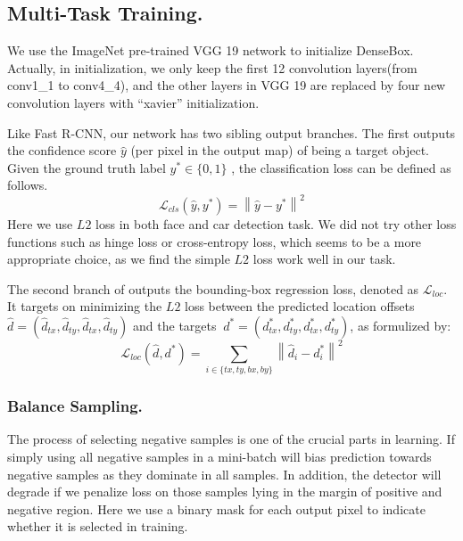 \subsection{Multi-Task Training.} 
\label{sec:training} 
We use the ImageNet pre-trained VGG 19 network to initialize DenseBox. Actually, in initialization, we only keep the first 12 convolution layers(from conv1\_1 to conv4\_4), and the other layers in VGG 19 are replaced by four new convolution layers with “xavier” initialization. 

Like Fast R-CNN, our network has two sibling output branches.  The first outputs the confidence score $ \hat{y}$ (per pixel in the output map) of being a target object.  Given the ground truth label $y^* \in \{0,1 \}$ , the classification loss can be defined as follows. 
	\begin{equation}\label{eq:eq_cls_loss}
	\mathcal{L} _{cls}(\hat{y},y^*) = \left \| \hat{y} - y^* \right \| ^2
	\end{equation}
Here we use $L2$ loss in both face and car detection task. We did not try other loss functions such as hinge loss or cross-entropy loss, which seems to be a more appropriate choice, as we find the simple $L2$ loss work well in our task. 

The second branch of outputs the bounding-box regression loss, denoted as $\mathcal{L} _{loc}$.  It targets on minimizing the $L2$ loss between the predicted location offsets $\hat{d} = (\hat{d}_{tx}, \hat{d}_{ty}, \hat{d}_{tx}, \hat{d}_{ty})$ and the targets  $\ d^* = (d^{*}_{tx},  d^{*}_{ty},  d^{*}_{tx}, d^{*}_{ty})$, as formulized by:
	\begin{equation}\label{eq:eq_loc_loss}
	\mathcal{L} _{loc}(\hat{d},d^*) =  \sum_{i \in \{ tx, ty,bx,by \} }  \left \| \hat{d}_{i} - d^*_{i} \right \| ^2
	\end{equation}

 \subsubsection{Balance Sampling.} 
The process of selecting negative samples is one of the crucial parts in learning. If simply using all negative samples in a mini-batch will bias prediction towards negative samples as they dominate in all samples.  In addition, the detector will degrade if we penalize loss on those samples lying in the margin of positive and negative region.  Here we use a binary mask for each output pixel to indicate whether it is selected in training. 

